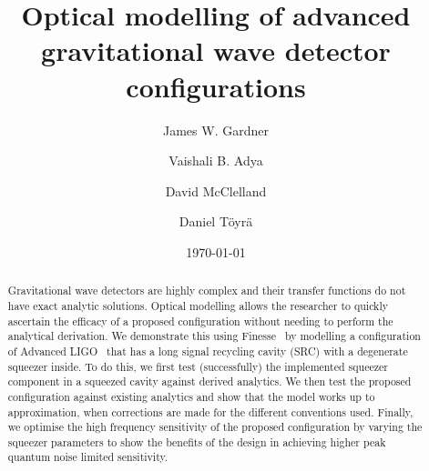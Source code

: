 \documentclass[aps,pra,superscriptaddress,reprint,nofootinbib]{revtex4-1}
\newcommand{\jam}[1]{\textcolor{magenta}{\textbf{#1}}}
\begin{document}
\title{Optical modelling of advanced gravitational wave detector configurations}

\author{James W. Gardner}

\author{Vaishali B. Adya}

\author{David McClelland}

\author{Daniel Töyrä}

\date{\today}


\begin{abstract}

Gravitational wave detectors are highly complex and their transfer functions do not have exact analytic solutions. Optical modelling allows the researcher to quickly ascertain the efficacy of a proposed configuration without needing to perform the analytical derivation. We demonstrate this using Finesse~\cite{finesse} by modelling a configuration of Advanced LIGO~\cite{AdvancedLIGO:2015} that has a long signal recycling cavity (SRC) with a degenerate squeezer inside. To do this, we first test (successfully) the implemented squeezer component in a squeezed cavity against derived analytics. We then test the proposed configuration against existing analytics and show that the model works up to approximation, when corrections are made for the different conventions used. Finally, we optimise the high frequency sensitivity of the proposed configuration by varying the squeezer parameters to show the benefits of the design in achieving higher peak quantum noise limited sensitivity.


\end{abstract}
\end{document}
